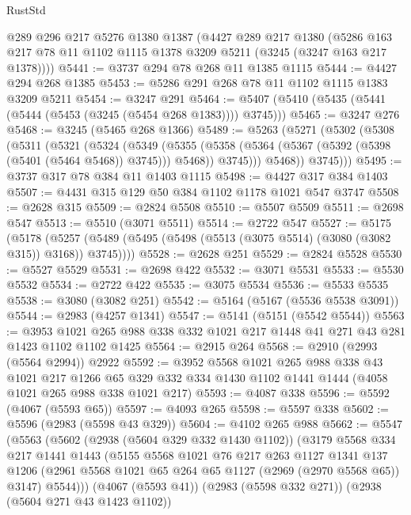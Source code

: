 \begin{lexlean}{RustStd}
\begin{coremodule}
    @289
    @296
    @217
    @5276
    @1380
    @1387
    (@4427
      @289
      @217
      @1380
      (@5286 @163 @217 @78 @11 @1102 @1115 @1378 @3209 @5211 (@3245 (@3247 @163 @217 @1378))))
@5441 := @3737 @294 @78 @268 @11 @1385 @1115
@5444 := @4427 @294 @268 @1385
@5453 := @5286 @291 @268 @78 @11 @1102 @1115 @1383 @3209 @5211
@5454 := @3247 @291
@5464 := @5407 (@5410 (@5435 (@5441 (@5444 (@5453 (@3245 (@5454 @268 @1383)))) @3745)))
@5465 := @3247 @276
@5468 := @3245 (@5465 @268 @1366)
@5489 := @5263
    (@5271
      (@5302
        (@5308
          (@5311
            (@5321
              (@5324
                (@5349
                  (@5355
                    (@5358 (@5364 (@5367 (@5392 (@5398 (@5401 (@5464 @5468)) @3745))) @5468))
                    @3745)))
              @5468))
          @3745)))
@5495 := @3737 @317 @78 @384 @11 @1403 @1115
@5498 := @4427 @317 @384 @1403
@5507 := @4431 @315 @129 @50 @384 @1102 @1178 @1021 @547 @3747
@5508 := @2628 @315
@5509 := @2824 @5508
@5510 := @5507 @5509
@5511 := @2698 @547
@5513 := @5510 (@3071 @5511)
@5514 := @2722 @547
@5527 := @5175
    (@5178 (@5257 (@5489 (@5495 (@5498 (@5513 (@3075 @5514) (@3080 (@3082 @315)) @3168)) @3745))))
@5528 := @2628 @251
@5529 := @2824 @5528
@5530 := @5527 @5529
@5531 := @2698 @422
@5532 := @3071 @5531
@5533 := @5530 @5532
@5534 := @2722 @422
@5535 := @3075 @5534
@5536 := @5533 @5535
@5538 := @3080 (@3082 @251)
@5542 := @5164 (@5167 (@5536 @5538 @3091))
@5544 := @2983 (@4257 @1341)
@5547 := @5141 (@5151 (@5542 @5544))
@5563 := @3953 @1021 @265 @988 @338 @332 @1021 @217 @1448 @41 @271 @43 @281 @1423 @1102 @1102 @1425
@5564 := @2915 @264
@5568 := @2910 (@2993 (@5564 @2994)) @2922
@5592 := @3952
    @5568
    @1021
    @265
    @988
    @338
    @43
    @1021
    @217
    @1266
    @65
    @329
    @332
    @334
    @1430
    @1102
    @1441
    @1444
    (@4058 @1021 @265 @988 @338 @1021 @217)
@5593 := @4087 @338
@5596 := @5592 (@4067 (@5593 @65))
@5597 := @4093 @265
@5598 := @5597 @338
@5602 := @5596 (@2983 (@5598 @43 @329))
@5604 := @4102 @265 @988
@5662 := @5547
    (@5563
      (@5602
        (@2938 (@5604 @329 @332 @1430 @1102))
        (@3179
          @5568
          @334
          @217
          @1441
          @1443
          (@5155
            @5568
            @1021
            @76
            @217
            @263
            @1127
            @1341
            @137
            @1206
            (@2961 @5568 @1021 @65 @264 @65 @1127 (@2969 (@2970 @5568 @65)) @3147)
            @5544)))
      (@4067 (@5593 @41))
      (@2983 (@5598 @332 @271))
      (@2938 (@5604 @271 @43 @1423 @1102))

\end{coremodule}
\end{lexlean}
